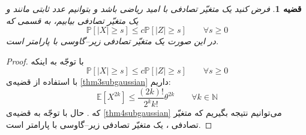 \documentclass[a4paper,12pt]{article}
\newtheorem{thm}{{\large\bf قضیه}}[section]
\newcommand{\E}{\mathbb{E}}
\newcommand{\Prob}{\mathbb{P}}
\newcommand{\Nd}{\mathcal{N}}
\begin{document}
	\begin{thm}\label{thm5subgaussian}
		فرض کنید 
		یک متغیّر تصادفی با امید ریاضی
		\lr{$\E[X]=0$}
		باشد و بتوانیم عدد ثابتی مانند
		و یک متغیّر تصادفی
		\lr{$Z\sim\Nd(0,\tau^2)$}
		بیابیم، به قسمی که
		\begin{equation}
		\Prob[|X|\geq s] \leq c \Prob[|Z|\geq s] \qquad \forall s \geq 0
		\end{equation}
		در این صورت 
		یک متغیّر تصادفی زیر--گاوسی با پارامتر
		است.
	\end{thm}
	\begin{proof}
		با توجّه به اینکه
		\[\Prob[|X|\geq s] \leq c \Prob[|Z|\geq s] \qquad \forall s \geq 0\]
		با استفاده از قضیه‌ی
		\ref{thm3subgaussian}
		داریم:
		\[\E\left[X^{2k}\right] \leq \frac{(2k)!}{2^kk!}\theta^{2k}\qquad \forall k \in \mathbb{N}\]
		که 
		.
		حال با توجّه به قضیه‌ی
		\ref{thm4subgaussian}
		می‌توانیم نتیجه بگیریم که متغیّر تصادفی
		،
		یک متغیّر تصادفی زیر--گاوسی با پارامتر
		است.
	\end{proof}
	
\end{document}
